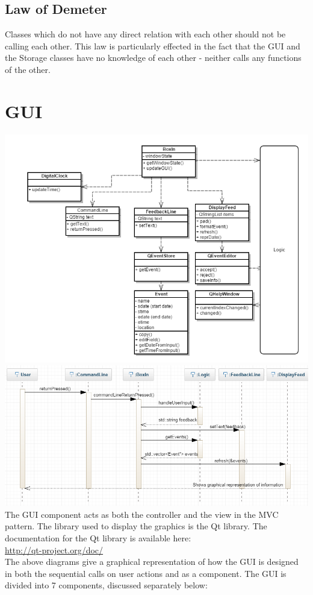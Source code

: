 \documentclass[12pt]{extarticle}
\begin{document}
\subsection{Law of Demeter}
Classes which do not have any direct relation with each other should not be calling each other. This law is particularly effected in the fact that the GUI and the Storage classes have no knowledge of each other - neither calls any functions of the other.


\section{GUI}
\includegraphics[width=\textwidth]{GUI_class_diagram}
\includegraphics[width=\textwidth]{gui_sequence_diagram}
\newpage
The GUI component acts as both the controller and the view in the MVC pattern. The library used to display the graphics is the Qt library. The documentation for the Qt library is available here:\\ \href{http://qt-project.org/doc/}{http://qt-project.org/doc/}\\
The above diagrams give a graphical representation of how the GUI is designed in both the sequential calls on user actions and as a component.
The GUI is divided into 7 components, discussed separately below:
\end{document}
